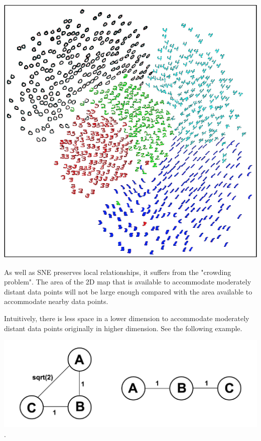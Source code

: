 \begin{center}
    \includegraphics[scale=0.5]{chapter_7/files/fig1.png}
\end{center}

\noindent As well as SNE preserves local relationships, it suffers
from the "crowding problem". The area of the 2D map that is available
to accommodate moderately distant data points will not be large enough
compared with the area available to accommodate nearby data points.

Intuitively, there is less space in a lower dimension to accommodate moderately distant data points originally in higher dimension. See the following example.

\begin{center}
    \includegraphics[scale=0.4]{chapter_7/files/fig2.png}
    . 
\end{center}

